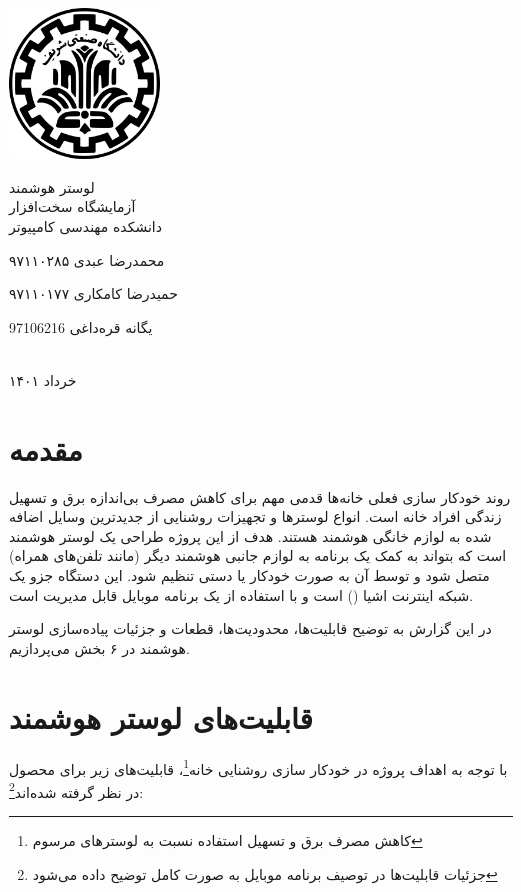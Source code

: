 \documentclass[12pt,a4paper]{article}
\begin{document}
	\thispagestyle{empty}
	\vspace*{0mm}
	\centerline{\includegraphics[height=4cm]{logo.png}}
	\vspace*{5mm}
	\begin{center}
		{\Huge
			لوستر هوشمند
		}
		\\[1cm]
		آزمایشگاه سخت‌افزار
		\\[1cm]
		دانشکده مهندسی کامپیوتر
		\\[4cm]
		{\large
			محمدرضا عبدی ۹۷۱۱۰۲۸۵
			
			حمیدرضا کامکاری ۹۷۱۱۰۱۷۷
			
			یگانه قره‌داغی 97106216
		}
		\\[5cm]
		خرداد ۱۴۰۱
	\end{center}
	\newpage
	
	\section*{مقدمه}
	
	روند خودکار سازی فعلی خانه‌ها قدمی مهم برای کاهش مصرف بی‌اندازه برق و تسهیل زندگی افراد خانه است. انواع لوستر‌ها و تجهیزات روشنایی از جدیدترین وسایل اضافه شده به لوازم خانگی هوشمند هستند. هدف از این پروژه طراحی یک لوستر هوشمند است که بتواند به کمک یک برنامه به لوازم جانبی هوشمند دیگر (مانند تلفن‌های همراه) متصل شود و توسط آن به صورت خودکار یا دستی تنظیم شود. این دستگاه جزو یک شبکه اینترنت اشیا () است و با استفاده از یک برنامه موبایل قابل مدیریت است. 
	
	در این گزارش به توضیح قابلیت‌ها، محدودیت‌ها، قطعات و جزئیات پیاده‌سازی لوستر هوشمند در ۶ بخش می‌پردازیم.
	
	\section{قابلیت‌های لوستر هوشمند}
	با توجه به اهداف پروژه در خودکار سازی روشنایی خانه\footnote{کاهش مصرف برق و تسهیل استفاده نسبت به لوسترهای مرسوم}، قابلیت‌های زیر برای محصول در نظر گرفته شده‌اند\footnote{جزئیات قابلیت‌ها در توصیف برنامه موبایل به صورت کامل توضیح داده‌ می‌شود}:
	
\end{document}
